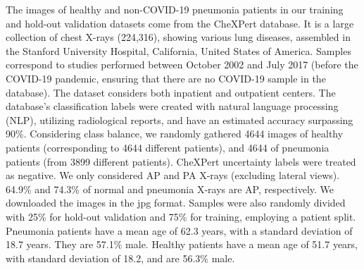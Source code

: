 \documentclass[fleqn,10pt]{wlscirep}
\begin{document}
{The images of healthy and non-COVID-19 pneumonia patients in our training and hold-out validation datasets come from the CheXPert database\cite{irvin2019chexpert}. It is a large collection of chest X-rays (224,316), showing various lung diseases, assembled in the Stanford University Hospital, California, United States of America. Samples correspond to studies performed between October 2002 and July 2017 (before the COVID-19 pandemic, ensuring that there are no COVID-19 sample in the database). The dataset considers both inpatient and outpatient centers. The database's classification labels were created with natural language processing (NLP), utilizing radiological reports, and have an estimated accuracy surpassing 90\%\cite{irvin2019chexpert}. Considering class balance, we randomly gathered 4644 images of healthy patients (corresponding to 4644 different patients), and 4644 of pneumonia patients (from 3899 different patients). CheXPert uncertainty labels were treated as negative. We only considered AP and PA X-rays (excluding lateral views). 64.9\% and 74.3\% of normal and pneumonia X-rays are AP, respectively. We downloaded the images in the jpg format. Samples were also randomly divided with 25\% for hold-out validation and 75\% for training, employing a patient split. Pneumonia patients have a mean age of 62.3 years, with a standard deviation of 18.7 years. They are 57.1\% male. Healthy patients have a mean age of 51.7 years, with standard deviation of 18.2, and are 56.3\% male.

}
\end{document}
